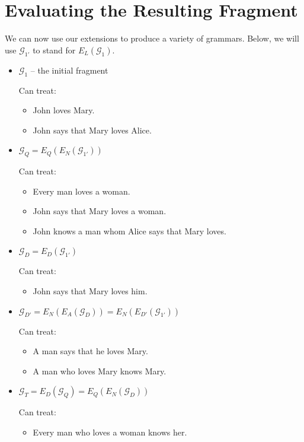 \section{Evaluating the Resulting Fragment}

We can now use our extensions to produce a variety of grammars. Below, we
will use $\mathcal{G}_{1'}$ to stand for $E_L(\mathcal{G}_1)$.

\begin{itemize}
\item $\mathcal{G}_1$ -- the initial fragment

  Can treat:
  \begin{itemize}
  \item John loves Mary.
  \item John says that Mary loves Alice.
  \end{itemize}

\item $\mathcal{G}_Q = E_Q(E_N(\mathcal{G}_{1'}))$

  Can treat:
  \begin{itemize}
  \item Every man loves a woman.
  \item John says that Mary loves a woman.
  \item John knows a man whom Alice says that Mary loves.
  \end{itemize}
  
\item $\mathcal{G}_D = E_D(\mathcal{G}_{1'})$

  Can treat:
  \begin{itemize}
  \item John says that Mary loves him.
  \end{itemize}

\item $\mathcal{G}_{D'} = E_N(E_A(\mathcal{G}_D)) = E_N(E_{D'}(\mathcal{G}_{1'}))$

  Can treat:
  \begin{itemize}
  \item A man says that he loves Mary.
  \item A man who loves Mary knows Mary.
  \end{itemize}

\item $\mathcal{G}_T = E_D(\mathcal{G}_Q) = E_Q(E_N(\mathcal{G}_D))$

  Can treat:
  \begin{itemize}
  \item Every man who loves a woman knows her.
  \end{itemize}
\end{itemize}
